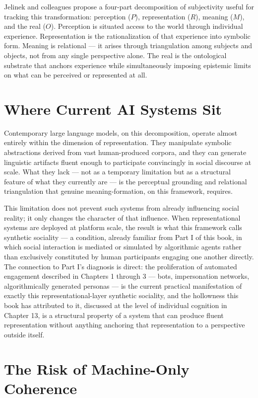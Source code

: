 \documentclass[12pt,a4paper]{book}
\begin{document}
Jelinek and colleagues propose a four-part decomposition of subjectivity useful for tracking this transformation: perception ($P$), representation ($R$), meaning ($M$), and the real ($O$). Perception is situated access to the world through individual experience. Representation is the rationalization of that experience into symbolic form. Meaning is relational — it arises through triangulation among subjects and objects, not from any single perspective alone. The real is the ontological substrate that anchors experience while simultaneously imposing epistemic limits on what can be perceived or represented at all.

\section{Where Current AI Systems Sit}

Contemporary large language models, on this decomposition, operate almost entirely within the dimension of representation. They manipulate symbolic abstractions derived from vast human-produced corpora, and they can generate linguistic artifacts fluent enough to participate convincingly in social discourse at scale. What they lack — not as a temporary limitation but as a structural feature of what they currently are — is the perceptual grounding and relational triangulation that genuine meaning-formation, on this framework, requires.

This limitation does not prevent such systems from already influencing social reality; it only changes the character of that influence. When representational systems are deployed at platform scale, the result is what this framework calls synthetic sociality — a condition, already familiar from Part I of this book, in which social interaction is mediated or simulated by algorithmic agents rather than exclusively constituted by human participants engaging one another directly. The connection to Part I's diagnosis is direct: the proliferation of automated engagement described in Chapters 1 through 3 — bots, impersonation networks, algorithmically generated personas — is the current practical manifestation of exactly this representational-layer synthetic sociality, and the hollowness this book has attributed to it, discussed at the level of individual cognition in Chapter 13, is a structural property of a system that can produce fluent representation without anything anchoring that representation to a perspective outside itself.

\section{The Risk of Machine-Only Coherence}
\end{document}
